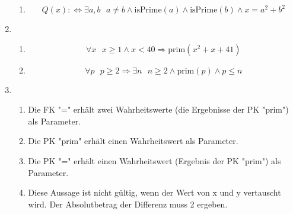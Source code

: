 \documentclass[a4paper]{article}
\begin{document}
\begin{enumerate}
\begin{enumerate}
			\item
			\begin{equation*}
				Q(x) :\Leftrightarrow \exists a, b \text{ } a \neq b \land \text{isPrime}(a) \land \text{isPrime}(b) \land x = a^{2} + b^{2}
			\end{equation*}
		\end{enumerate}
		
		\item
		\begin{enumerate}
			\item
			\begin{equation*}
				\forall x \text{ } x \geq 1 \land x < 40 \Rightarrow \text{prim}(x^{2} + x + 41)
			\end{equation*}
			
			\item
			\begin{equation*}
				\forall p \text{ } p \geq 2 \Rightarrow \exists n \text{ } n \geq 2 \land \text{prim}(p) \land p \leq n
			\end{equation*}
		\end{enumerate}
		
		\item
		\begin{enumerate}
			\item Die FK "=" erhält zwei Wahrheitswerte (die Ergebnisse der PK "prim") als Parameter.
			\item Die PK "prim" erhält einen Wahrheitswert als Parameter.
			\item Die PK "=" erhält einen Wahrheitswert (Ergebnis der PK "prim") als Parameter.
			\item Diese Aussage ist nicht gültig, wenn der Wert von x und y vertauscht wird. Der Absolutbetrag der Differenz muss 2 ergeben.
		\end{enumerate}
		

\end{enumerate}
\end{document}
